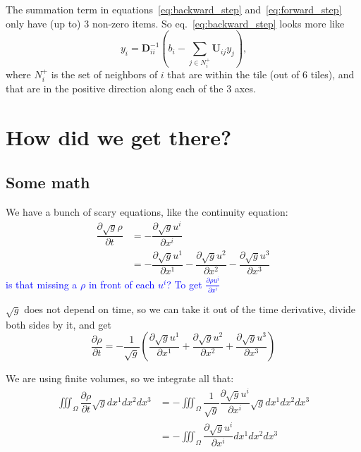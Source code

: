 \documentclass[12pt]{article}
\newcommand{\todo}[1]{\textcolor{blue}{#1}}
\begin{document}
The summation term in equations~\ref{eq:backward_step} and~\ref{eq:forward_step} only have (up to) 3 non-zero items. So eq.~\ref{eq:backward_step} looks more like
\begin{equation}
    y_i = \bm{D}_{ii}^{-1} \left( b_i - \sum_{j\in N_i^+} \bm{U}_{ij} y_j \right)
    \text{,}
\end{equation}
where $N_i^+$ is the set of neighbors of $i$ that are within the tile (out of 6 tiles), and that are in the positive direction along each of the 3 axes.

\section{How did we get there?}

\subsection{Some math}

We have a bunch of scary equations, like the continuity equation:
\begin{align}
    \dfrac{\partial\sqrt{g}\rho}{\partial t} &= -\dfrac{\partial\sqrt{g}u^i}{\partial x^i} \\
        &= -\dfrac{\partial\sqrt{g}u^1}{\partial x^1}
           -\dfrac{\partial\sqrt{g}u^2}{\partial x^2} 
           -\dfrac{\partial\sqrt{g}u^3}{\partial x^3}
\end{align}
\todo{is that missing a $\rho$ in front of each $u^i$? To get $\frac{\partial\rho u^i}{\partial x^i}$}

$\sqrt{g}$ does not depend on time, so we can take it out of the time derivative, divide both sides by it, and get
\begin{equation}
    \dfrac{\partial\rho}{\partial t} = -\dfrac{1}{\sqrt{g}} \left(
            \dfrac{\partial\sqrt{g}u^1}{\partial x^1}
           +\dfrac{\partial\sqrt{g}u^2}{\partial x^2} 
           +\dfrac{\partial\sqrt{g}u^3}{\partial x^3}\right)
\end{equation}

We are using finite volumes, so we integrate all that:
\begin{align}
    \iiint_{\Omega} \dfrac{\partial\rho}{\partial t} \sqrt{g}dx^1dx^2dx^3
        &= -\iiint_{\Omega} \dfrac{1}{\sqrt{g}}\dfrac{\partial\sqrt{g}u^i}{\partial x^i} \sqrt{g}dx^1dx^2dx^3 \\
        &= -\iiint_{\Omega} \dfrac{\partial\sqrt{g}u^i}{\partial x^i} dx^1dx^2dx^3 
\end{align}
\end{document}
